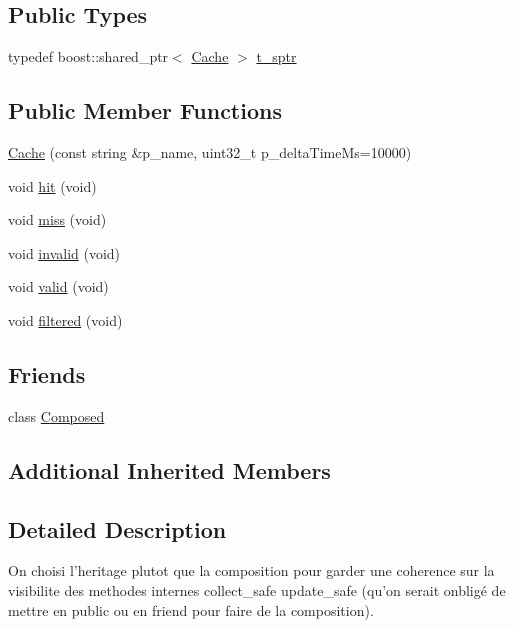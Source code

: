 \subsection*{Public Types}
\begin{DoxyCompactItemize}
\item 
typedef boost\-::shared\-\_\-ptr$<$ \hyperlink{classxtd_1_1counters_1_1Cache}{Cache} $>$ \hyperlink{classxtd_1_1counters_1_1Cache_ad248c57507dbfd4b90332551fd0d5f1b}{t\-\_\-sptr}
\end{DoxyCompactItemize}
\subsection*{Public Member Functions}
\begin{DoxyCompactItemize}
\item 
\hyperlink{classxtd_1_1counters_1_1Cache_a73df8a43eff5fd364e41dccabc562d54}{Cache} (const string \&p\-\_\-name, uint32\-\_\-t p\-\_\-delta\-Time\-Ms=10000)
\item 
void \hyperlink{classxtd_1_1counters_1_1Cache_a57101c273f95f2cf4d5a71627f0b23de}{hit} (void)
\item 
void \hyperlink{classxtd_1_1counters_1_1Cache_a71c25293724fa534633e6d5c9f2cc36d}{miss} (void)
\item 
void \hyperlink{classxtd_1_1counters_1_1Cache_a419b5620c93818158193cb6aca015c9b}{invalid} (void)
\item 
void \hyperlink{classxtd_1_1counters_1_1Cache_a42ea3f207a0399b1864f3ee918e8a0e4}{valid} (void)
\item 
void \hyperlink{classxtd_1_1counters_1_1Cache_a827a66e44b127d38c5f808fa38a2535a}{filtered} (void)
\end{DoxyCompactItemize}
\subsection*{Friends}
\begin{DoxyCompactItemize}
\item 
class \hyperlink{classxtd_1_1counters_1_1Cache_a93e934ad70d5b32b14beed5572450abf}{Composed}
\end{DoxyCompactItemize}
\subsection*{Additional Inherited Members}


\subsection{Detailed Description}
On choisi l'heritage plutot que la composition pour garder une coherence sur la visibilite des methodes internes collect\-\_\-safe update\-\_\-safe (qu'on serait onbligé de mettre en public ou en friend pour faire de la composition). 

